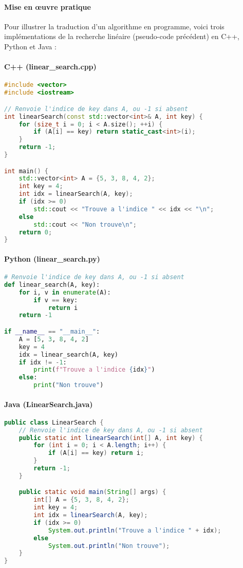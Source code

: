 \paragraph{Mise en œuvre pratique}
Pour illustrer la traduction d’un algorithme en programme, voici trois
implémentations de la recherche linéaire (pseudo-code précédent) en
C++, Python et Java :


\paragraph{C++ (linear\_search.cpp)}
\begin{lstlisting}[language=C++,caption={linear\_search.cpp}]
#include <vector>
#include <iostream>

// Renvoie l'indice de key dans A, ou -1 si absent
int linearSearch(const std::vector<int>& A, int key) {
    for (size_t i = 0; i < A.size(); ++i) {
        if (A[i] == key) return static_cast<int>(i);
    }
    return -1;
}

int main() {
    std::vector<int> A = {5, 3, 8, 4, 2};
    int key = 4;
    int idx = linearSearch(A, key);
    if (idx >= 0)
        std::cout << "Trouve a l'indice " << idx << "\n";
    else
        std::cout << "Non trouve\n";
    return 0;
}
\end{lstlisting}

\paragraph{Python (linear\_search.py)}
\begin{lstlisting}[language=Python,caption={linear\_search.py}]
# Renvoie l'indice de key dans A, ou -1 si absent
def linear_search(A, key):
    for i, v in enumerate(A):
        if v == key:
            return i
    return -1

if __name__ == "__main__":
    A = [5, 3, 8, 4, 2]
    key = 4
    idx = linear_search(A, key)
    if idx != -1:
        print(f"Trouve a l'indice {idx}")
    else:
        print("Non trouve")
\end{lstlisting}

\paragraph{Java (LinearSearch.java)}
\begin{lstlisting}[language=Java,caption={LinearSearch.java}]
public class LinearSearch {
    // Renvoie l'indice de key dans A, ou -1 si absent
    public static int linearSearch(int[] A, int key) {
        for (int i = 0; i < A.length; i++) {
            if (A[i] == key) return i;
        }
        return -1;
    }

    public static void main(String[] args) {
        int[] A = {5, 3, 8, 4, 2};
        int key = 4;
        int idx = linearSearch(A, key);
        if (idx >= 0)
            System.out.println("Trouve a l'indice " + idx);
        else
            System.out.println("Non trouve");
    }
}
\end{lstlisting}

